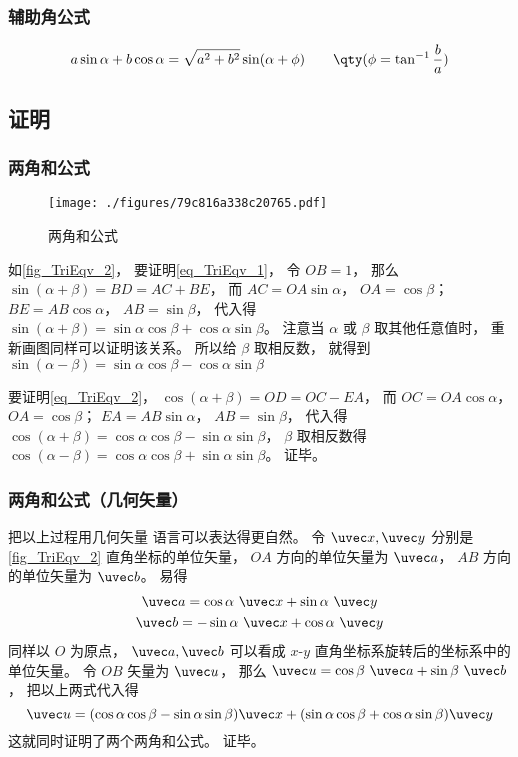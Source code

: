 \subsubsection{辅助角公式}
\begin{equation}
a\sin \alpha + b\cos \alpha = \sqrt{a^2+b^2}\sin(\alpha + \phi) \qquad \qty(\phi = \tan^{-1}\frac{b}{a})
\end{equation}

\subsection{证明}\label{sub_TriEqv_1}
\subsubsection{两角和公式}
\begin{figure}[ht]
\centering
\texttt{[image: ./figures/79c816a338c20765.pdf]}
\caption{两角和公式} \label{fig_TriEqv_2}
\end{figure}
如\autoref{fig_TriEqv_2}， 要证明\autoref{eq_TriEqv_1}， 令 $OB = 1$， 那么 $\sin(\alpha+\beta) = BD = AC + BE$， 而 $AC = OA \sin\alpha$， $OA = \cos\beta$； $BE = AB\cos\alpha$， $AB = \sin\beta$， 代入得 $\sin(\alpha+\beta) = \sin\alpha\cos\beta + \cos\alpha\sin\beta$。 注意当 $\alpha$ 或 $\beta$ 取其他任意值时， 重新画图同样可以证明该关系。 所以给 $\beta$ 取相反数， 就得到 $\sin(\alpha-\beta) = \sin\alpha\cos\beta - \cos\alpha\sin\beta$

要证明\autoref{eq_TriEqv_2}， $\cos(\alpha+\beta) = OD = OC - EA$， 而 $OC = OA\cos\alpha$， $OA = \cos\beta$； $EA = AB\sin\alpha$， $AB = \sin\beta$， 代入得 $\cos(\alpha+\beta) = \cos\alpha\cos\beta - \sin\alpha\sin\beta$， $\beta$ 取相反数得 $\cos(\alpha-\beta) = \cos\alpha\cos\beta + \sin\alpha\sin\beta$。 证毕。

\subsubsection{两角和公式（几何矢量）}
把以上过程用几何矢量 语言可以表达得更自然。 令 $\uvec x, \uvec y$ 分别是\autoref{fig_TriEqv_2} 直角坐标的单位矢量， $OA$ 方向的单位矢量为 $\uvec a$， $AB$ 方向的单位矢量为 $\uvec b$。 易得
\begin{gather}
\uvec a = \cos\alpha\ \uvec x + \sin\alpha\ \uvec y\\
\uvec b = -\sin\alpha\ \uvec x + \cos\alpha\ \uvec y
\end{gather}
同样以 $O$ 为原点， $\uvec a, \uvec b$ 可以看成 $x$-$y$ 直角坐标系旋转后的坐标系中的单位矢量。 令 $OB$ 矢量为 $\uvec u$， 那么 $\uvec u = \cos\beta\ \uvec a + \sin\beta\ \uvec b$， 把以上两式代入得
\begin{equation}
\uvec u = (\cos\alpha\cos\beta - \sin\alpha\sin\beta)\uvec x + (\sin\alpha\cos\beta + \cos\alpha\sin\beta)\uvec y
\end{equation}
这就同时证明了两个两角和公式。 证毕。

